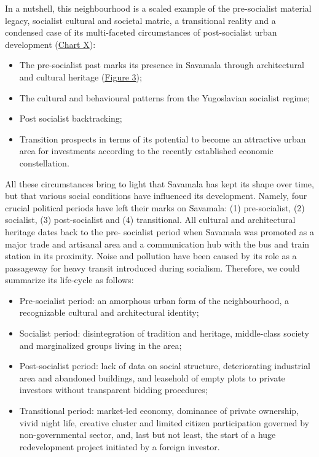 \documentclass[11pt]{report}
\begin{document}
In a nutshell, this neighbourhood is a scaled example of the pre-socialist material legacy, socialist cultural and societal matric, a transitional reality and a condensed case of its multi-faceted circumstances of post-socialist urban development (\href{Chart Savamala Space-time}{Chart X}):

\begin{itemize}
\item The pre-socialist past marks its presence in Savamala through architectural and cultural heritage (\href{Figure 3}{Figure 3});
\item The cultural and behavioural patterns from the Yugoslavian socialist regime;
\item Post socialist backtracking;
\item Transition prospects in terms of its potential to become an attractive urban area for investments according to the recently established economic constellation.
\end{itemize}

All these circumstances bring to light that Savamala has kept its shape over time, but that various social conditions have influenced its development. Namely, four crucial political periods have left their marks on Savamala: (1) pre-socialist, (2) socialist, (3) post-socialist and (4) transitional. All cultural and architectural heritage dates back to the pre- socialist period when Savamala was promoted as a major trade and artisanal area and a communication hub with the bus and train station in its proximity. Noise and pollution have been caused by its role as a passageway for heavy transit introduced during socialism. Therefore, we could summarize its life-cycle as follows:

\begin{itemize}
\item Pre-socialist period: an amorphous urban form of the neighbourhood, a recognizable cultural  and  architectural  identity;

\item Socialist period: disintegration of tradition and heritage, middle-class society and marginalized groups living in the area;

\item Post-socialist period: lack of data on social structure, deteriorating industrial area and abandoned buildings, and leasehold of empty plots to private investors without transparent bidding procedures;

\item Transitional period: market-led economy, dominance of private ownership, vivid night life, creative cluster and limited citizen participation governed by non-governmental sector, and, last but not least, the start of a huge redevelopment project initiated by a foreign investor.
\end{itemize}
\end{document}
